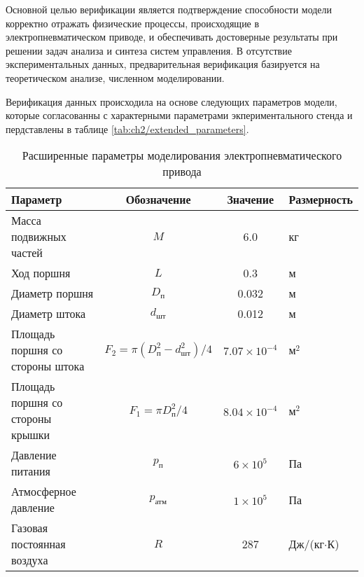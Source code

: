 Основной целью верификации является подтверждение способности модели корректно отражать физические процессы,
происходящие в электропневматическом приводе, и обеспечивать достоверные результаты при решении задач анализа и синтеза систем управления.
В отсутствие экспериментальных данных, предварительная верификация базируется на теоретическом анализе,
численном моделировании.

Верификация данных происходила на основе следующих параметров модели, которые согласованны
с характерными параметрами экпериментального стенда и пердставлены в
таблице \ref{tab:ch2/extended_parameters}.

\begin{table}[h]
    \centering
    \caption{Расширенные параметры моделирования электропневматического привода}
    \small
    \begin{tabular}{lccl}
        \textbf{Параметр}                & \textbf{Обозначение}                      & \textbf{Значение}     & \textbf{Размерность} \\
        \midrule
        Масса подвижных частей           & $M$                                       & 6.0                   & кг                   \\
        Ход поршня                       & $L$                                       & 0.3                   & м                    \\
        Диаметр поршня                   & $D_\text{п}$                              & 0.032                 & м                    \\
        Диаметр штока                    & $d_\text{шт}$                             & 0.012                 & м                    \\
        Площадь поршня со стороны штока  & $F_2 = \pi(D_\text{п}^2-d_\text{шт}^2)/4$ & $7.07 \times 10^{-4}$ & м$^2$                \\
        Площадь поршня со стороны крышки & $F_1 = \pi D_\text{п}^2/4$                & $8.04 \times 10^{-4}$ & м$^2$                \\
        Давление питания                 & $p_\text{п}$                              & $6 \times 10^5$       & Па                   \\
        Атмосферное давление             & $p_\text{атм}$                            & $1 \times 10^5$       & Па                   \\
        Газовая постоянная воздуха       & $R$                                       & 287                   & Дж/(кг$\cdot$К)      \\

\end{tabular}
\end{table}
